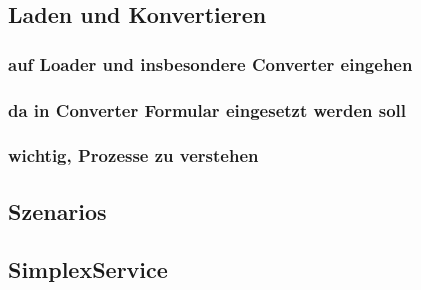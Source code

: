 \documentclass[oneside,a4paper,11pt,openright]{scrreprt}
\begin{document}
\subsection{Laden und Konvertieren}
\subsubsection{auf Loader und insbesondere Converter eingehen}
\subsubsection{da in Converter Formular eingesetzt werden soll}
\subsubsection{wichtig, Prozesse zu verstehen}
\subsection{Szenarios}
\subsection{SimplexService}

\clearpage




\end{document}
